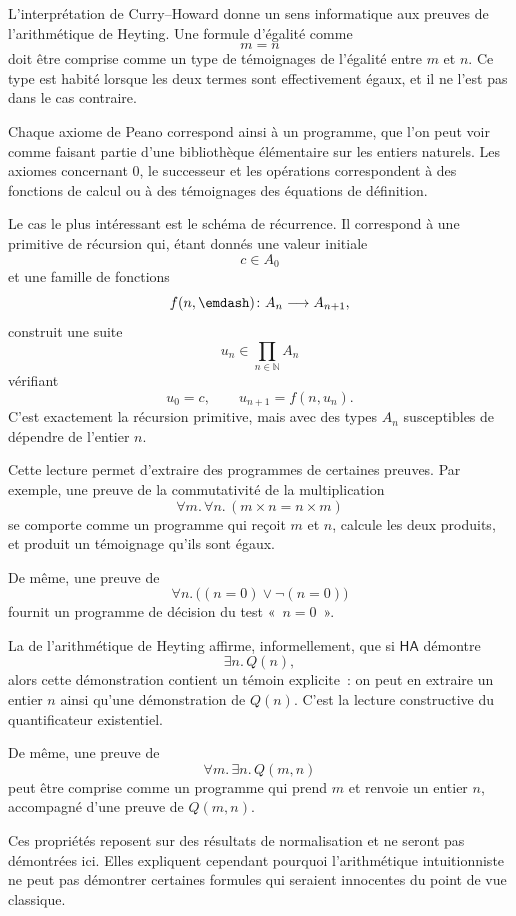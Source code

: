 \thingy
L'interprétation de Curry--Howard donne un sens informatique aux preuves
de l'arithmétique de Heyting.  Une formule d'égalité comme
\[
m=n
\]
doit être comprise comme un type de témoignages de l'égalité entre $m$
et $n$.  Ce type est habité lorsque les deux termes sont effectivement
égaux, et il ne l'est pas dans le cas contraire.

\thingy
Chaque axiome de Peano correspond ainsi à un programme, que l'on peut
voir comme faisant partie d'une bibliothèque élémentaire sur les entiers
naturels.  Les axiomes concernant $0$, le successeur et les opérations
correspondent à des fonctions de calcul ou à des témoignages des
équations de définition.

Le cas le plus intéressant est le schéma de récurrence.  Il correspond à
une primitive de récursion qui, étant donnés une valeur initiale
\[
c\in A_0
\]
et une famille de fonctions
\[
f(n,\emdash)\colon A_n\longrightarrow A_{n+1},
\]
construit une suite
\[
u_n\in\prod_{n\in\mathbb{N}} A_n
\]
vérifiant
\[
u_0=c,
\qquad
u_{n+1}=f(n,u_n).
\]
C'est exactement la récursion primitive, mais avec des types $A_n$
susceptibles de dépendre de l'entier $n$.

\thingy
Cette lecture permet d'extraire des programmes de certaines preuves.  Par
exemple, une preuve de la commutativité de la multiplication
\[
\forall m.\,\forall n.\,(m\times n=n\times m)
\]
se comporte comme un programme qui reçoit $m$ et $n$, calcule les deux
produits, et produit un témoignage qu'ils sont égaux.

De même, une preuve de
\[
\forall n.\,\bigl((n=0)\lor\neg(n=0)\bigr)
\]
fournit un programme de décision du test « $n=0$ ».

\thingy
La  de l'arithmétique de Heyting affirme,
informellement, que si $\mathsf{HA}$ démontre
\[
\exists n.\,Q(n),
\]
alors cette démonstration contient un témoin explicite : on peut en
extraire un entier $n$ ainsi qu'une démonstration de $Q(n)$.  C'est la
lecture constructive du quantificateur existentiel.

De même, une preuve de
\[
\forall m.\,\exists n.\,Q(m,n)
\]
peut être comprise comme un programme qui prend $m$ et renvoie un entier
$n$, accompagné d'une preuve de $Q(m,n)$.

\thingy
Ces propriétés reposent sur des résultats de normalisation et ne seront
pas démontrées ici.  Elles expliquent cependant pourquoi l'arithmétique
intuitionniste ne peut pas démontrer certaines formules qui seraient
innocentes du point de vue classique.

